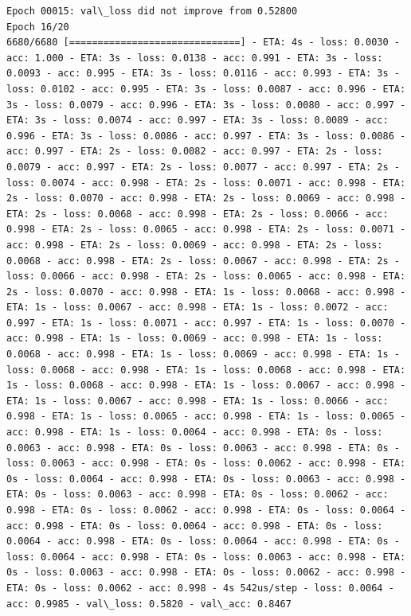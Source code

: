 \documentclass[11pt]{article}
\begin{document}
\begin{Verbatim}[commandchars=\\\{\}]
Epoch 00015: val\_loss did not improve from 0.52800
Epoch 16/20
6680/6680 [==============================] - ETA: 4s - loss: 0.0030 - acc: 1.000 - ETA: 3s - loss: 0.0138 - acc: 0.991 - ETA: 3s - loss: 0.0093 - acc: 0.995 - ETA: 3s - loss: 0.0116 - acc: 0.993 - ETA: 3s - loss: 0.0102 - acc: 0.995 - ETA: 3s - loss: 0.0087 - acc: 0.996 - ETA: 3s - loss: 0.0079 - acc: 0.996 - ETA: 3s - loss: 0.0080 - acc: 0.997 - ETA: 3s - loss: 0.0074 - acc: 0.997 - ETA: 3s - loss: 0.0089 - acc: 0.996 - ETA: 3s - loss: 0.0086 - acc: 0.997 - ETA: 3s - loss: 0.0086 - acc: 0.997 - ETA: 2s - loss: 0.0082 - acc: 0.997 - ETA: 2s - loss: 0.0079 - acc: 0.997 - ETA: 2s - loss: 0.0077 - acc: 0.997 - ETA: 2s - loss: 0.0074 - acc: 0.998 - ETA: 2s - loss: 0.0071 - acc: 0.998 - ETA: 2s - loss: 0.0070 - acc: 0.998 - ETA: 2s - loss: 0.0069 - acc: 0.998 - ETA: 2s - loss: 0.0068 - acc: 0.998 - ETA: 2s - loss: 0.0066 - acc: 0.998 - ETA: 2s - loss: 0.0065 - acc: 0.998 - ETA: 2s - loss: 0.0071 - acc: 0.998 - ETA: 2s - loss: 0.0069 - acc: 0.998 - ETA: 2s - loss: 0.0068 - acc: 0.998 - ETA: 2s - loss: 0.0067 - acc: 0.998 - ETA: 2s - loss: 0.0066 - acc: 0.998 - ETA: 2s - loss: 0.0065 - acc: 0.998 - ETA: 2s - loss: 0.0070 - acc: 0.998 - ETA: 1s - loss: 0.0068 - acc: 0.998 - ETA: 1s - loss: 0.0067 - acc: 0.998 - ETA: 1s - loss: 0.0072 - acc: 0.997 - ETA: 1s - loss: 0.0071 - acc: 0.997 - ETA: 1s - loss: 0.0070 - acc: 0.998 - ETA: 1s - loss: 0.0069 - acc: 0.998 - ETA: 1s - loss: 0.0068 - acc: 0.998 - ETA: 1s - loss: 0.0069 - acc: 0.998 - ETA: 1s - loss: 0.0068 - acc: 0.998 - ETA: 1s - loss: 0.0068 - acc: 0.998 - ETA: 1s - loss: 0.0068 - acc: 0.998 - ETA: 1s - loss: 0.0067 - acc: 0.998 - ETA: 1s - loss: 0.0067 - acc: 0.998 - ETA: 1s - loss: 0.0066 - acc: 0.998 - ETA: 1s - loss: 0.0065 - acc: 0.998 - ETA: 1s - loss: 0.0065 - acc: 0.998 - ETA: 1s - loss: 0.0064 - acc: 0.998 - ETA: 0s - loss: 0.0063 - acc: 0.998 - ETA: 0s - loss: 0.0063 - acc: 0.998 - ETA: 0s - loss: 0.0063 - acc: 0.998 - ETA: 0s - loss: 0.0062 - acc: 0.998 - ETA: 0s - loss: 0.0064 - acc: 0.998 - ETA: 0s - loss: 0.0063 - acc: 0.998 - ETA: 0s - loss: 0.0063 - acc: 0.998 - ETA: 0s - loss: 0.0062 - acc: 0.998 - ETA: 0s - loss: 0.0062 - acc: 0.998 - ETA: 0s - loss: 0.0064 - acc: 0.998 - ETA: 0s - loss: 0.0064 - acc: 0.998 - ETA: 0s - loss: 0.0064 - acc: 0.998 - ETA: 0s - loss: 0.0064 - acc: 0.998 - ETA: 0s - loss: 0.0064 - acc: 0.998 - ETA: 0s - loss: 0.0063 - acc: 0.998 - ETA: 0s - loss: 0.0063 - acc: 0.998 - ETA: 0s - loss: 0.0062 - acc: 0.998 - ETA: 0s - loss: 0.0062 - acc: 0.998 - 4s 542us/step - loss: 0.0064 - acc: 0.9985 - val\_loss: 0.5820 - val\_acc: 0.8467


\end{Verbatim}
\end{document}
